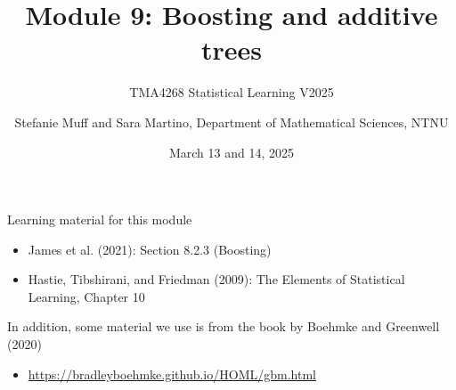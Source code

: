 \documentclass[
  10pt,
  ignorenonframetext,
]{beamer}
\title{Module 9: Boosting and additive trees}
\subtitle{TMA4268 Statistical Learning V2025}
\author{Stefanie Muff and Sara Martino, Department of Mathematical
Sciences, NTNU}
\date{March 13 and 14, 2025}
\providecommand{\tightlist}{%
  \setlength{\itemsep}{0pt}\setlength{\parskip}{0pt}}
\begin{document}
\frame{\titlepage}

\begin{frame}
\begin{block}{Learning material for this module}
\label{learning-material-for-this-module}
\(~\)

\begin{itemize}
\tightlist
\item
  James et al. (2021): Section 8.2.3 (Boosting)
\end{itemize}

\vspace{2mm}

\begin{itemize}
\tightlist
\item
  Hastie, Tibshirani, and Friedman (2009): The Elements of Statistical
  Learning, Chapter 10
\end{itemize}

\vspace{8mm}

In addition, some material we use is from the book by Boehmke and
Greenwell (2020)

\vspace{2mm}

\begin{itemize}
\tightlist
\item
  \url{https://bradleyboehmke.github.io/HOML/gbm.html}
\end{itemize}
\end{block}
\end{frame}
\end{document}
